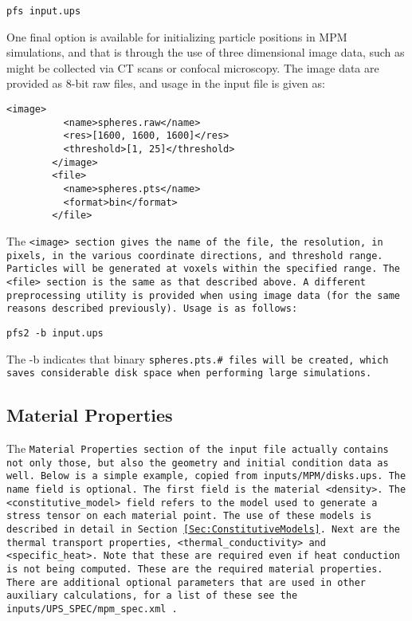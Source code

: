 \begin{Verbatim}[fontsize=\footnotesize]
   pfs input.ups
\end{Verbatim}

One final option is available for initializing particle positions in MPM
simulations, and that is through the use of three dimensional image data,
such as might be collected via CT scans or confocal microscopy.  The image data are provided as 8-bit raw files, and usage in the input file is given as:

\begin{Verbatim}[fontsize=\footnotesize]
        <image>
          <name>spheres.raw</name>
          <res>[1600, 1600, 1600]</res>
          <threshold>[1, 25]</threshold>
        </image>
        <file>
          <name>spheres.pts</name>
          <format>bin</format>
        </file>
\end{Verbatim}

The \tt <image> \normalfont section gives the name of the file, the resolution, in pixels,
in the various coordinate directions, and threshold range.  Particles will be
generated at voxels within the specified range.  The \tt <file> \normalfont
section is the same as that described above.  A different preprocessing utility
is provided when using image data (for the same reasons described previously).
Usage is as follows:

\begin{Verbatim}[fontsize=\footnotesize]
   pfs2 -b input.ups
\end{Verbatim}

The -b indicates that binary \tt spheres.pts.\# \normalfont files will be created, which
saves considerable disk space when performing large simulations.



\subsection{Material Properties} \label{Sec:mat_props}

The \tt Material Properties \normalfont section of the input file
actually contains not only those, but also the geometry and initial
condition data as well.  Below is a simple example, copied from
\tt inputs/MPM/disks.ups. \normalfont  The \tt name \normalfont field
is optional.  The first field is the material \tt <density>. \normalfont
The \tt <constitutive\_model> \normalfont field refers
to the model used to generate a stress tensor on each material point.
The use of these models is described in detail in
Section~\ref{Sec:ConstitutiveModels}.  Next are the thermal transport properties,
\tt <thermal\_conductivity> \normalfont and 
\tt <specific\_heat>. \normalfont  Note that these are required even if
heat conduction is not being computed.  These are the required material
properties.  There are additional optional parameters that are used in
other auxiliary calculations, for a list of these
see the \tt inputs/UPS\_SPEC/mpm\_spec.xml \normalfont.

